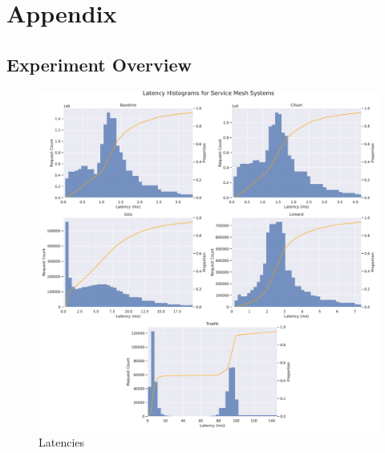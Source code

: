 \chapter*{Appendix}





\section{Experiment Overview}





\begin{figure}[p]
    \centering
    
    \includegraphics[width=\linewidth]{5_experimental_evaluation/figures/exp-01-distributions-all.pdf}

    \caption[Histogram of latencies under maximum load]{Latencies}
    \label{fig:exp:01:hist-latency-traefik}
\end{figure}


